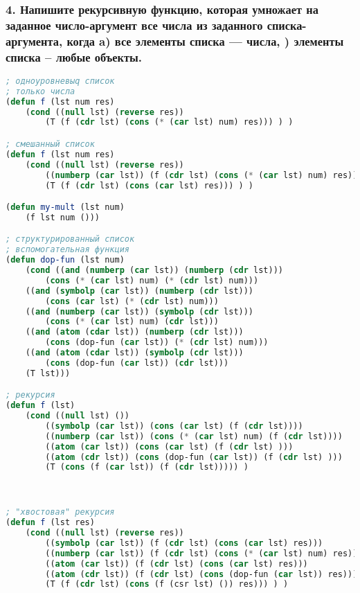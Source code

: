 \subsubsection*{4. Напишите рекурсивную функцию, которая умножает на заданное число-аргумент все числа из заданного списка-аргумента, когда \newline a) все элементы списка --- числа, ) элементы списка -- любые объекты.}
\begin{lstlisting}[language=Lisp]
; одноуровневыq список
; только числа
(defun f (lst num res)
	(cond ((null lst) (reverse res))
		(T (f (cdr lst) (cons (* (car lst) num) res))) ) )

; смешанный список
(defun f (lst num res)
	(cond ((null lst) (reverse res))
		((numberp (car lst)) (f (cdr lst) (cons (* (car lst) num) res)))
		(T (f (cdr lst) (cons (car lst) res))) ) )

(defun my-mult (lst num)
	(f lst num ()))

; структурированный список
; вспомогательная функция
(defun dop-fun (lst num)
	(cond ((and (numberp (car lst)) (numberp (cdr lst))) 
		(cons (* (car lst) num) (* (cdr lst) num)))
	((and (symbolp (car lst)) (numberp (cdr lst))) 
		(cons (car lst) (* (cdr lst) num)))
	((and (numberp (car lst)) (symbolp (cdr lst))) 
		(cons (* (car lst) num) (cdr lst)))
	((and (atom (cdar lst)) (numberp (cdr lst))) 
		(cons (dop-fun (car lst)) (* (cdr lst) num)))
	((and (atom (cdar lst)) (symbolp (cdr lst))) 
		(cons (dop-fun (car lst)) (cdr lst)))
	(T lst)))

; рекурсия
(defun f (lst)
	(cond ((null lst) ())
		((symbolp (car lst)) (cons (car lst) (f (cdr lst))))
		((numberp (car lst)) (cons (* (car lst) num) (f (cdr lst))))
		((atom (car lst)) (cons (car lst) (f (cdr lst) )))
		((atom (cdr lst)) (cons (dop-fun (car lst)) (f (cdr lst) )))
		(T (cons (f (car lst)) (f (cdr lst))))) )



; "хвостовая" рекурсия
(defun f (lst res)
	(cond ((null lst) (reverse res))
		((symbolp (car lst)) (f (cdr lst) (cons (car lst) res)))
		((numberp (car lst)) (f (cdr lst) (cons (* (car lst) num) res)))
		((atom (car lst)) (f (cdr lst) (cons (car lst) res)))
		((atom (cdr lst)) (f (cdr lst) (cons (dop-fun (car lst)) res)))
		(T (f (cdr lst) (cons (f (csr lst) ()) res))) ) )
		
	\end{lstlisting}

\newpage
